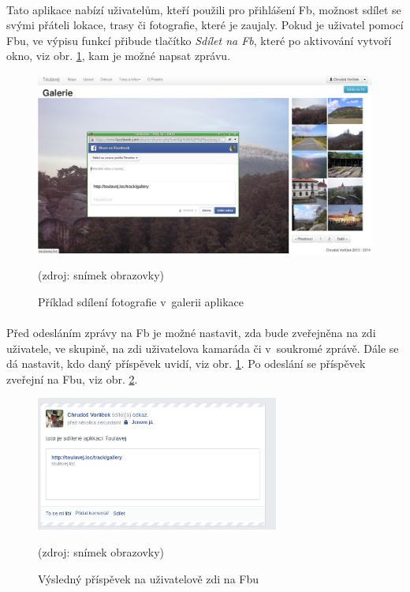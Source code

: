\documentclass[11pt,a4paper,titlepage,oneside]{book}
\begin{document}

				\paragraph{}Tato aplikace nabízí uživatelům, kteří použili pro přihlášení \acl{Fb}, možnost sdílet se svými přáteli lokace, trasy či fotografie, které je zaujaly. Pokud je uživatel pomocí \acl{Fb}u, ve výpisu funkcí přibude tlačítko \textit{Sdílet na Fb}, které po aktivování vytvoří okno, viz obr. \ref{fig:fbShare1}, kam je možné napsat zprávu.
		\begin{figure}[!h]
			\begin{center}
				\includegraphics[width=12cm]{obrazky/toulavej/fbShareGallery.png}
				\caption{Příklad sdílení fotografie v~galerii aplikace }
				\label{fig:fbShare1}
				(zdroj: snímek obrazovky)
			\end{center}
		\end{figure}
	\paragraph{}Před odesláním zprávy na \acl{Fb} je možné nastavit, zda bude zveřejněna na zdi uživatele, ve skupině, na zdi uživatelova kamaráda či v~soukromé zprávě. Dále se dá nastavit, kdo daný příspěvek uvidí, viz obr. \ref{fig:fbShare1}.  Po odeslání se příspěvek zveřejní na \acl{Fb}u, viz obr. \ref{fig:fbShare2}.
		\begin{figure}[!h]
			\begin{center}
				\includegraphics[width=8cm]{obrazky/toulavej/fbSharefb.png}
				\caption{Výsledný příspěvek na uživatelově zdi na \acl{Fb}u}
				\label{fig:fbShare2}
				(zdroj: snímek obrazovky)
			\end{center}
		\end{figure}				
\end{document}
